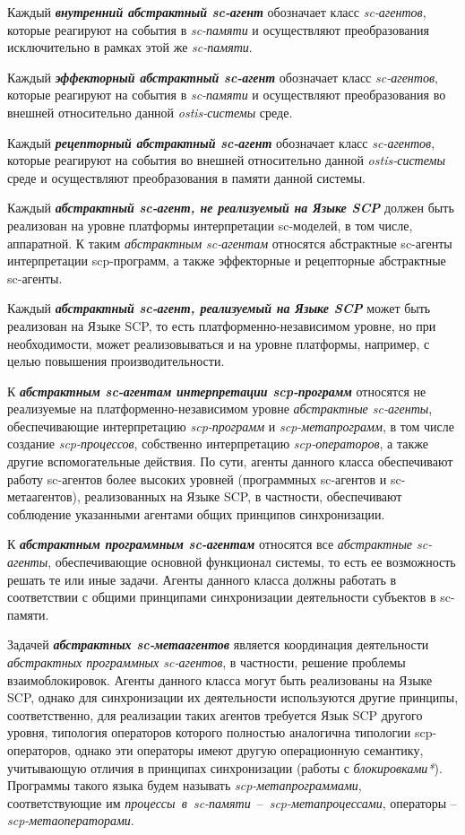 Каждый \textbf{\textit{внутренний абстрактный sc-агент}} обозначает класс \textit{sc-агентов}, которые реагируют на события в \textit{sc-памяти} и осуществляют преобразования исключительно в рамках этой же \textit{sc-памяти}.

Каждый \textbf{\textit{эффекторный абстрактный sc-агент}} обозначает класс \textit{sc-агентов}, которые реагируют на события в \textit{sc-памяти} и осуществляют преобразования во внешней относительно данной \textit{ostis-системы} среде.

Каждый \textbf{\textit{рецепторный абстрактный sc-агент}} обозначает класс \textit{sc-агентов}, которые реагируют на события во внешней относительно данной \textit{ostis-системы} среде и осуществляют преобразования в памяти данной системы.

Каждый \textbf{\textit{абстрактный sc-агент, не реализуемый на Языке SCP}} должен быть реализован на уровне платформы интерпретации sc-моделей, в том числе, аппаратной. К таким \textit{абстрактным sc-агентам} относятся абстрактные sc-агенты интерпретации scp-программ, а также эффекторные и рецепторные абстрактные sc-агенты.

Каждый \textbf{\textit{абстрактный sc-агент, реализуемый на Языке SCP}} может быть реализован на Языке SCP, то есть платформенно-независимом уровне, но при необходимости, может реализовываться и на уровне платформы, например, с целью повышения производительности.

К \textbf{\textit{абстрактным sc-агентам интерпретации scp-программ}} относятся не реализуемые на платформенно-независимом уровне \textit{абстрактные sc-агенты}, обеспечивающие интерпретацию \textit{scp-программ} и \textit{\mbox{scp-метапрограмм}}, в том числе создание \textit{scp-процессов}, собственно интерпретацию \textit{scp-операторов}, а также другие вспомогательные действия. По сути, агенты данного класса обеспечивают работу sc-агентов более высоких уровней (программных sc-агентов и sc-метаагентов), реализованных на Языке SCP, в частности, обеспечивают соблюдение указанными агентами общих принципов синхронизации.

К \textbf{\textit{абстрактным программным sc-агентам}} относятся все \textit{абстрактные sc-агенты}, обеспечивающие основной функционал системы, то есть ее возможность решать те или иные задачи. Агенты данного класса должны работать в соответствии с общими принципами синхронизации деятельности субъектов в sc-памяти.

Задачей \textbf{\textit{абстрактных sc-метаагентов}} является координация деятельности \textit{абстрактных программных sc-агентов}, в частности, решение проблемы взаимоблокировок. Агенты данного класса могут быть реализованы на Языке SCP, однако для синхронизации их деятельности используются другие принципы, соответственно, для реализации таких агентов требуется Язык SCP другого уровня, типология операторов которого полностью аналогична типологии scp-операторов, однако эти операторы имеют другую операционную семантику, учитывающую отличия в принципах синхронизации (работы с \textit{блокировками*}). Программы такого языка будем называть \textit{scp-метапрограммами}, соответствующие им \mbox{\textit{процессы в sc-памяти} -- \textit{scp-метапроцессами}}, операторы -- \textit{scp-метаоператорами}.

